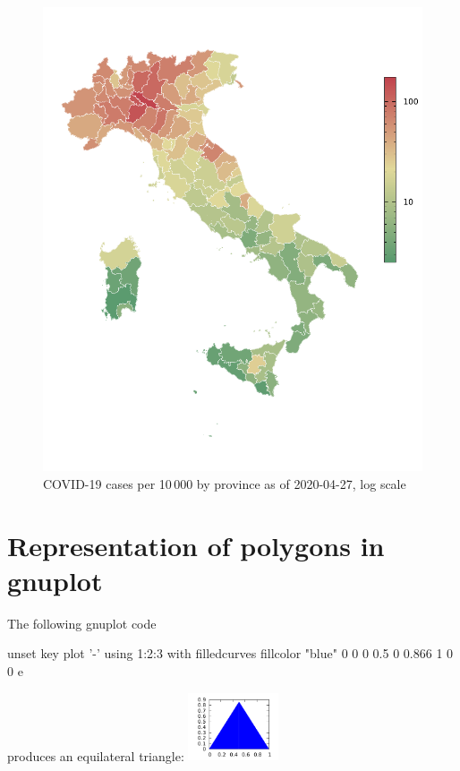 \documentclass{article}
\begin{document}
\begin{figure}[p]
  \centering
  \includegraphics{covid.pdf}
  \caption{COVID-19 cases per 10\,000 by province as of
    2020-04-27, log scale}
  \label{fig:ita-covid}
\end{figure}


\clearpage
\appendix

\section{Representation of polygons in gnuplot}
\label{sec:gnuplot}

The
following \textsf{gnuplot} code
\begin{code}
  unset key
  plot '-' using 1:2:3 with filledcurves fillcolor "blue"
  0 0 0
  0.5 0 0.866
  1 0 0
  e
\end{code}
produces an equilateral triangle: \includegraphics[height=2cm]{triangle.pdf}
\end{document}
